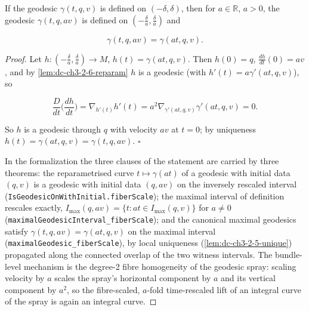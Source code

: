 \begin{lemma}
  \label{lem:dc-ch3-2-6}
  \leanok
  If the geodesic $\gamma(t,q,v)$ is defined on $(-\delta,\delta)$, then for
  $a\in\mathbb{R}$, $a>0$, the geodesic $\gamma(t,q,av)$ is defined on
  $(-\frac{\delta}{a},\frac{\delta}{a})$ and

  $$
  \gamma(t,q,av)=\gamma(at,q,v).
  $$
\end{lemma}
\begin{proof}
  \leanok
  Let $h:(-\frac{\delta}{a},\frac{\delta}{a})\to M$, $h(t)=\gamma(at,q,v)$.
  Then $h(0)=q$, $\frac{dh}{dt}(0)=av$, and by \cref{lem:dc-ch3-2-6-reparam}
  $h$ is a geodesic (with $h'(t)=a\gamma'(at,q,v)$), so

  $$
  \frac{D}{dt}\Big(\frac{dh}{dt}\Big)=\nabla_{h'(t)}h'(t)=a^2\nabla_{\gamma'(at,q,v)}\gamma'(at,q,v)=0.
  $$

  So $h$ is a geodesic through $q$ with velocity $av$ at $t=0$; by uniqueness
  $h(t)=\gamma(at,q,v)=\gamma(t,q,av)$. $\square$

  In the formalization the three clauses of the statement are carried by three
  theorems: the reparametrised curve $t\mapsto\gamma(at)$ of a geodesic with
  initial data $(q,v)$ is a geodesic with initial data $(q,av)$ on the inversely
  rescaled interval (\texttt{IsGeodesicOnWithInitial.fiberScale}); the maximal
  interval of definition rescales exactly,
  $I_{\max}(q,av)=\{t:at\in I_{\max}(q,v)\}$ for $a\neq0$
  (\texttt{maximalGeodesicInterval\_fiberScale}); and the canonical maximal
  geodesics satisfy $\gamma(t,q,av)=\gamma(at,q,v)$ on the maximal interval
  (\texttt{maximalGeodesic\_fiberScale}), by local uniqueness
  (\cref{lem:dc-ch3-2-5-unique}) propagated along the connected overlap of the
  two witness intervals. The bundle-level mechanism is the degree-2 fibre
  homogeneity of the geodesic spray: scaling velocity by $a$ scales the
  spray's horizontal component by $a$ and its vertical component by $a^2$, so
  the fibre-scaled, $a$-fold time-rescaled lift of an integral curve of the
  spray is again an integral curve.
\end{proof}

